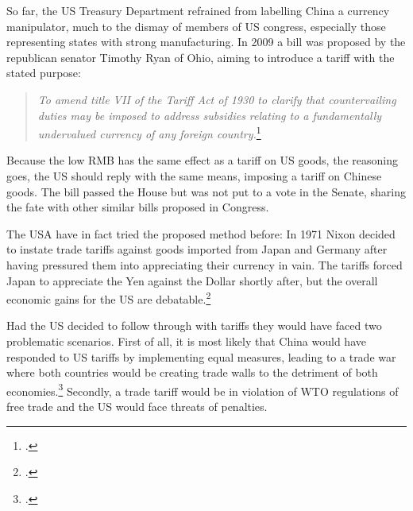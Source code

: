 
So far, the US Treasury Department refrained from labelling China a currency manipulator, much to the dismay of members of US congress, especially those representing states with strong manufacturing.
In 2009 a bill was proposed by the republican senator Timothy Ryan of 
Ohio, aiming to introduce a tariff with the stated purpose:

\begin{quotation}
\textit{To amend title VII of the Tariff Act of 1930 to clarify that 
countervailing duties may be imposed to address subsidies relating to a 
fundamentally undervalued currency of any foreign 
country.}\footnote{\cite{Ryan2009}.}
\end{quotation}

Because the low RMB has the same effect as a tariff on US 
goods, the reasoning goes, the US should reply with the same means, 
imposing a tariff on Chinese goods. The bill passed the House but was 
not put to a vote in the Senate, sharing the fate with other similar 
bills proposed in Congress. 

The USA have in fact tried the proposed method before: In 1971 Nixon decided to instate trade 
tariffs against goods imported from Japan and Germany after having 
pressured them into appreciating their currency in vain. The tariffs 
forced Japan to appreciate the Yen against the Dollar shortly after, but 
the overall economic gains for the US are debatable.\footnote{\cite{kuroda2004}.} 

Had the US decided to follow through with tariffs they would have faced 
two problematic scenarios. First of all, it is most likely that China 
would have responded to US tariffs by implementing equal measures, 
leading to a trade war where both countries would be creating trade 
walls to the detriment of both economies.\footnote{\cite{Levy2010}.} 
Secondly, a trade tariff would be in violation of WTO regulations of 
free trade and the US would face threats of penalties. 



